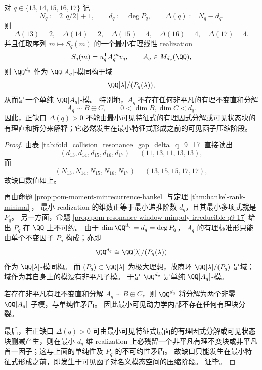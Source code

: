 \begin{theorem}[结论 10（2026-04-14 12:43:32 +08）：共振缺口的不可约起源与最小可见模块的单纯性]\label{thm:killo-fold-resonance-gap-simple-module}
对 \(q\in\{13,14,15,16,17\}\) 记
\[
N_q:=2\lfloor q/2\rfloor+1,\qquad
d_q:=\deg P_q,\qquad
\Delta(q):=N_q-d_q.
\]
则
\[
\Delta(13)=2,\quad \Delta(14)=2,\quad \Delta(15)=4,\quad \Delta(16)=4,\quad \Delta(17)=4.
\]
并且任取序列 \(m\mapsto S_q(m)\) 的一个最小有理线性 realization
\[
S_q(m)=u_q^{\mathsf T}A_q^{\,m}v_q,\qquad A_q\in M_{d_q}(\QQ),
\]
则 \(\QQ^{d_q}\) 作为 \(\QQ[A_q]\)-模同构于域
\[
\QQ[\lambda]/(P_q(\lambda)),
\]
从而是一个单纯 \(\QQ[A_q]\)-模。
特别地，\(A_q\) 不存在任何非平凡的有理不变直和分解
\[
A_q\sim B\oplus C,\qquad 0<\dim B,\dim C<d_q.
\]
因此，正缺口 \(\Delta(q)>0\) 不能由最小可见特征式的有理因式分解或可见状态块的有理直和拆分来解释；它必然发生在最小特征式形成之前的可见函子压缩阶段。
\end{theorem}

\begin{proof}
由表 \ref{tab:fold_collision_resonance_gap_delta_q_9_17} 直接读出
\[
(d_{13},d_{14},d_{15},d_{16},d_{17})=(11,13,11,13,13),
\]
而
\[
(N_{13},N_{14},N_{15},N_{16},N_{17})=(13,15,15,17,17),
\]
故缺口数值如上。

再由命题 \ref{prop:pom-moment-minrecurrence-hankel} 与定理
\ref{thm:hankel-rank-minimal}，
最小 realization 的维数正等于最小递推阶数 \(d_q\)，且其最小多项式就是 \(P_q\)。
另一方面，命题 \ref{prop:pom-resonance-window-minpoly-irreducible-q9-17} 给出
\(
P_q
\)
在 \(\QQ\) 上不可约。
由于
\(
\dim \QQ^{d_q}=d_q=\deg P_q
\)，
\(A_q\) 的有理标准形只能由单个不变因子 \(P_q\) 构成；亦即
\[
\QQ^{d_q}\cong \QQ[\lambda]/(P_q(\lambda))
\]
作为 \(\QQ[\lambda]\)-模同构。
而 \((P_q)\subset \QQ[\lambda]\) 为极大理想，故商环
\(
\QQ[\lambda]/(P_q)
\)
是域；域作为其自身上的模没有非平凡子模。
于是 \(\QQ^{d_q}\) 是单纯 \(\QQ[A_q]\)-模。

若存在非平凡有理不变直和分解 \(A_q\sim B\oplus C\)，则
\(
\QQ^{d_q}
\)
将分解为两个非零 \(\QQ[A_q]\)-子模，与单纯性矛盾。
因此最小可见动力学内部不存在任何有理块分裂。

最后，若正缺口 \(\Delta(q)>0\) 可由最小可见特征式层面的有理因式分解或可见状态块删减产生，则在最小 \(d_q\)-维 realization 上必残留一个非平凡有理不变块或非平凡首一因子；这与上面的单纯性及 \(P_q\) 的不可约性矛盾。
故缺口只能发生在最小特征式形成之前，即发生于可见函子对名义模态空间的压缩阶段。
证毕。
\end{proof}

